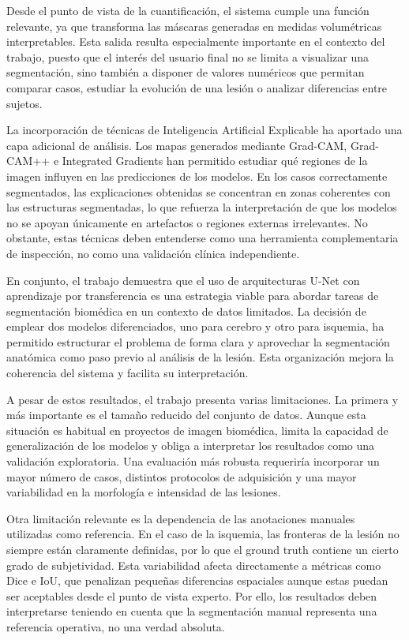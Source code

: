 Desde el punto de vista de la cuantificación, el sistema cumple una función relevante, ya que transforma las máscaras generadas en medidas volumétricas interpretables.
Esta salida resulta especialmente importante en el contexto del trabajo, puesto que el interés del usuario final no se limita a visualizar una segmentación, sino también a 
disponer de valores numéricos que permitan comparar casos, estudiar la evolución de una lesión o analizar diferencias entre sujetos.

La incorporación de técnicas de Inteligencia Artificial Explicable ha aportado una capa adicional de análisis. Los mapas generados mediante Grad-CAM, Grad-CAM++ e 
Integrated Gradients han permitido estudiar qué regiones de la imagen influyen en las predicciones de los modelos. En los casos correctamente segmentados, las explicaciones 
obtenidas se concentran en zonas coherentes con las estructuras segmentadas, lo que refuerza la interpretación de que los modelos no se apoyan únicamente en artefactos o regiones 
externas irrelevantes. No obstante, estas técnicas deben entenderse como una herramienta complementaria de inspección, no como una validación clínica independiente.

En conjunto, el trabajo demuestra que el uso de arquitecturas U-Net con aprendizaje por transferencia es una estrategia viable para abordar tareas de segmentación biomédica
en un contexto de datos limitados. La decisión de emplear dos modelos diferenciados, uno para cerebro y otro para isquemia, ha permitido estructurar el problema de forma clara
y aprovechar la segmentación anatómica como paso previo al análisis de la lesión. Esta organización mejora la coherencia del sistema y facilita su interpretación.

A pesar de estos resultados, el trabajo presenta varias limitaciones. La primera y más importante es el tamaño reducido del conjunto de datos. Aunque esta situación es habitual 
en proyectos de imagen biomédica, limita la capacidad de generalización de los modelos y obliga a interpretar los resultados como una validación exploratoria. Una evaluación más
robusta requeriría incorporar un mayor número de casos, distintos protocolos de adquisición y una mayor variabilidad en la morfología e intensidad de las lesiones.

Otra limitación relevante es la dependencia de las anotaciones manuales utilizadas como referencia. En el caso de la isquemia, las fronteras de la lesión no siempre están
claramente definidas, por lo que el ground truth contiene un cierto grado de subjetividad. Esta variabilidad afecta directamente a métricas como Dice e IoU, que penalizan
pequeñas diferencias espaciales aunque estas puedan ser aceptables desde el punto de vista experto. Por ello, los resultados deben interpretarse teniendo en cuenta que la
segmentación manual representa una referencia operativa, no una verdad absoluta.

